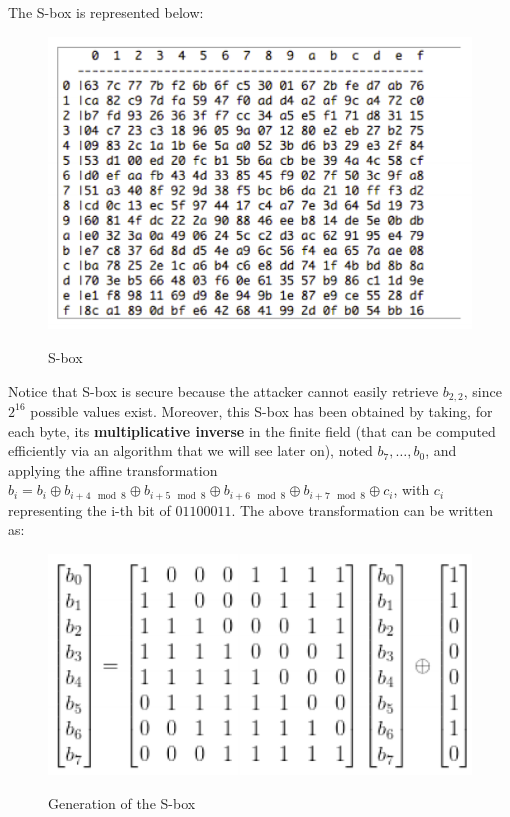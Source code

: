 \begin{enumerate}
    The S-box is represented below:

    \begin{figure}[h!]
        \centering
        \includegraphics[scale = 0.8]{img/aes4.png}
        \label{aes4}
        \caption{S-box}
    \end{figure}

    Notice that S-box is secure because the attacker cannot easily retrieve $b_{2,2}$, since $2^{16}$ possible values exist. Moreover, this S-box has been obtained by taking, for each byte, its \textbf{multiplicative inverse} in the finite field (that can be computed efficiently via an algorithm that we will see later on), noted $b_7, \ldots, b_0$, and applying the affine transformation $b_i = b_i \oplus b_{i+4 \mod 8} \oplus b_{i+5 \mod 8} \oplus b_{i+6 \mod 8}\oplus b_{i+7 \mod 8} \oplus c_i$, with $c_i$ representing the i-th bit of $01100011$. The above transformation can be written as:

    \begin{figure}[h!]
        \centering
        \includegraphics[scale = 0.65]{img/aes5.png}
        \label{aes5}
        \caption{Generation of the S-box}
    \end{figure}


\end{enumerate}
